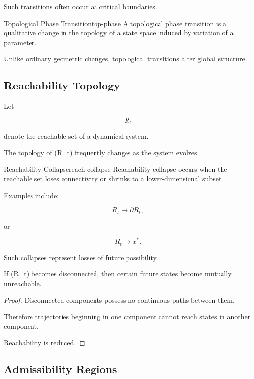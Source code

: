 \documentclass[12pt,twoside,openright]{book}
\newenvironment{prop}
{\begin{proposition}{}{}}
{\end{proposition}}
\begin{document}
Such transitions often occur at critical boundaries.

\begin{definition}{Topological Phase Transition}{top-phase}
A topological phase transition is a qualitative change in
the topology of a state space induced by variation of a
parameter.
\end{definition}

Unlike ordinary geometric changes, topological
transitions alter global structure.

\subsection{Reachability Topology}

Let

\[
R_t
\]

denote the reachable set of a dynamical system.

The topology of (R_t) frequently changes as the system
evolves.

\begin{definition}{Reachability Collapse}{reach-collapse}
Reachability collapse occurs when the reachable set loses
connectivity or shrinks to a lower-dimensional subset.
\end{definition}

Examples include:

\[
R_t
\rightarrow
\partial R_t,
\]

or

\[
R_t
\rightarrow
{x^*}.
\]

Such collapses represent losses of future possibility.

\begin{prop}
If (R_t) becomes disconnected, then certain future
states become mutually unreachable.
\end{prop}

\begin{proof}
Disconnected components possess no continuous paths
between them.

Therefore trajectories beginning in one component cannot
reach states in another component.

Reachability is reduced.
\end{proof}

\subsection{Admissibility Regions}
\end{document}
